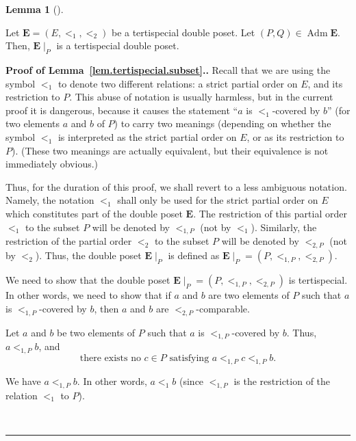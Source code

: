 \documentclass[numbers=enddot,12pt,final,onecolumn,notitlepage,abstracton]{scrartcl}
\theoremstyle{definition}
\newtheorem{lem}[theo]{Lemma}
\newenvironment{lemma}[1][]
{\begin{lem}[#1]\begin{leftbar}}
{\end{leftbar}\end{lem}}
\newenvironment{proof}[1][Proof]{\noindent\textbf{#1.} }{\ \rule{0.5em}{0.5em}}
\newcommand{\Adm}{\operatorname{Adm}}
\newcommand{\EE}{{\mathbf{E}}}
\begin{document}
\begin{lemma}
\label{lem.tertispecial.subset}
Let $\EE = \left(E, <_1, <_2\right)$ be a tertispecial
double poset.
Let $\left(P,Q\right) \in \Adm \EE$. Then, $\EE\mid_P$ is
a tertispecial double poset.
\end{lemma}

\begin{proof}[Proof of Lemma~\ref{lem.tertispecial.subset}.]
Recall that we are using the symbol $<_1$ to denote two
different relations:
a strict partial order on $E$, and its restriction to $P$.
This abuse of notation is usually harmless, but in the
current proof it is dangerous, because it causes the statement
``$a$ is $<_1$-covered by $b$'' (for two elements $a$ and
$b$ of $P$) to carry two meanings (depending on whether the
symbol $<_1$ is interpreted as the strict partial order on
$E$, or as its restriction to $P$). (These two meanings are
actually equivalent, but their equivalence is not immediately
obvious.)

Thus, for the duration of this proof, we shall revert to a
less ambiguous notation. Namely, the notation $<_1$ shall
only be used for the strict partial order on $E$ which
constitutes part of the double poset $\EE$. The restriction
of this partial order $<_1$ to the subset $P$ will be denoted
by $<_{1,P}$ (not by $<_1$). Similarly, the restriction of
the partial order $<_2$ to the subset $P$ will be denoted by
$<_{2,P}$ (not by $<_2$). Thus, the double poset
$\EE\mid_P$ is defined as
$\EE\mid_P = \left(P, <_{1,P}, <_{2,P}\right)$.

We need to show that the double poset
$\EE\mid_P = \left(P, <_{1,P}, <_{2,P}\right)$ is
tertispecial. In other words, we need to show that if $a$
and $b$ are two elements of $P$ such that $a$ is
$<_{1,P}$-covered by $b$, then $a$ and $b$
are $<_{2,P}$-comparable.

Let $a$ and $b$ be two elements of $P$ such that $a$ is
$<_{1,P}$-covered by $b$. Thus,
$a <_{1,P} b$, and
\begin{equation}
\text{there exists no } c \in P \text{ satisfying }
a <_{1,P} c <_{1,P} b .
\label{pf.lem.tertispecial.subset.1}
\end{equation}

We have $a <_{1,P} b$. In other words, $a <_1 b$ (since
$<_{1,P}$ is the restriction of the relation $<_1$ to $P$).


\end{proof}
\end{document}
